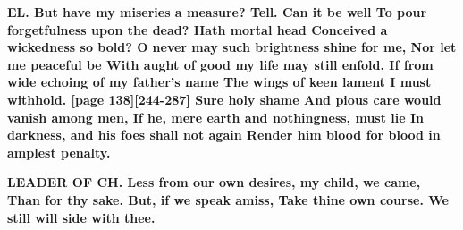 \documentclass[11pt,letter]{book}
\begin{document}
\par \textbf{EL. But have my miseries a measure? Tell. Can it be well To pour forgetfulness upon the dead? Hath mortal head Conceived a wickedness so bold? O never may such brightness shine for me, Nor let me peaceful be With aught of good my life may still enfold, If from wide echoing of my father’s name The wings of keen lament I must withhold. [page 138][244-287] Sure holy shame And pious care would vanish among men, If he, mere earth and nothingness, must lie In darkness, and his foes shall not again Render him blood for blood in amplest penalty.}
\par 

\par \textbf{LEADER OF CH. Less from our own desires, my child, we came, Than for thy sake. But, if we speak amiss, Take thine own course. We still will side with thee.}
\par 
\end{document}
